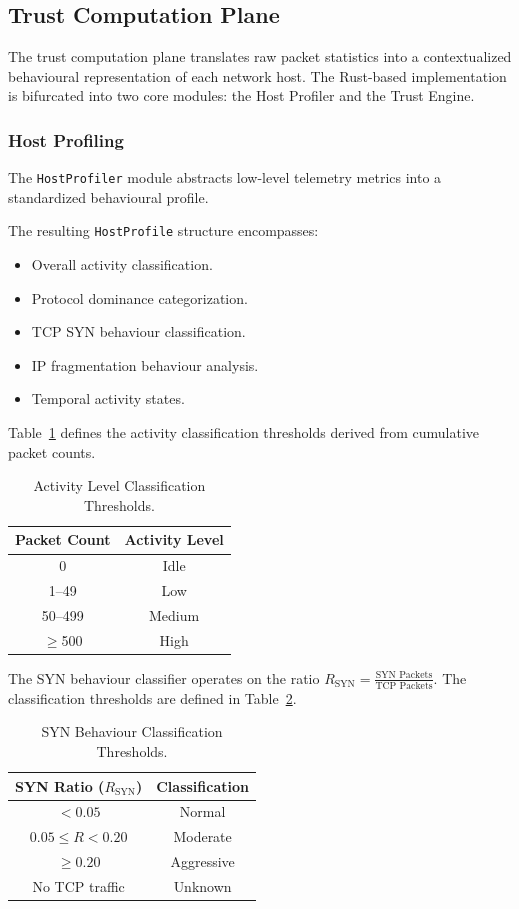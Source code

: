 \documentclass[conference]{IEEEtran}
\begin{document}
\subsection{Trust Computation Plane}

The trust computation plane translates raw packet statistics into a contextualized behavioural representation of each network host. The Rust-based implementation is bifurcated into two core modules: the Host Profiler and the Trust Engine.

\subsubsection{Host Profiling}
The \texttt{HostProfiler} module abstracts low-level telemetry metrics into a standardized behavioural profile. 

The resulting \texttt{HostProfile} structure encompasses:
\begin{itemize}
\item Overall activity classification.
\item Protocol dominance categorization.
\item TCP SYN behaviour classification.
\item IP fragmentation behaviour analysis.
\item Temporal activity states.
\end{itemize}

Table~\ref{tab:activity} defines the activity classification thresholds derived from cumulative packet counts.

\begin{table}[h]
\centering
\caption{Activity Level Classification Thresholds.}
\label{tab:activity}
\begin{tabular}{cc}
\toprule
Packet Count & Activity Level \\
\midrule
0 & Idle \\
1--49 & Low \\
50--499 & Medium \\
$\geq$500 & High \\
\bottomrule
\end{tabular}
\end{table}

The SYN behaviour classifier operates on the ratio $R_{\text{SYN}} = \frac{\text{SYN Packets}}{\text{TCP Packets}}$. The classification thresholds are defined in Table~\ref{tab:syn_thresholds}.

\begin{table}[h]
\centering
\caption{SYN Behaviour Classification Thresholds.}
\label{tab:syn_thresholds}
\begin{tabular}{cc}
\toprule
SYN Ratio ($R_{\text{SYN}}$) & Classification \\
\midrule
$< 0.05$ & Normal \\
$0.05 \leq R < 0.20$ & Moderate \\
$\geq 0.20$ & Aggressive \\
No TCP traffic & Unknown \\
\bottomrule
\end{tabular}
\end{table}
\end{document}
